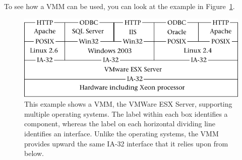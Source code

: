 To see how a VMM can be used, you can look at the example in
Figure~\ref{vmm-example}.
\begin{figure}
\centerline{\includegraphics{hail_f0718}}

\caption{This example shows a VMM, the VMWare ESX Server, supporting multiple operating
  systems.  The label within each box identifies a component, whereas
  the label on each horizontal dividing line identifies an interface.
  Unlike the operating systems, the VMM provides upward the same IA-32
  interface that it relies upon from below.}
\label{vmm-example}
\end{figure}
